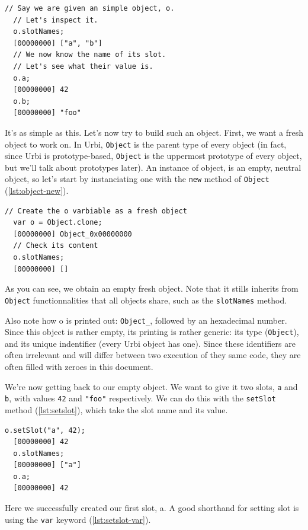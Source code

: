 \documentclass[openright,twoside,12pt]{report}
\newcommand{\urbi}{Urbi\xspace}
\newcommand{\lst}[1]{\autoref{lst:#1}}
\begin{document}
\begin{lstlisting}[caption=Inspecting an \urbi
  object,label=lst:object-slots]
  // Say we are given an simple object, o.
  // Let's inspect it.
  o.slotNames;
  [00000000] ["a", "b"]
  // We now know the name of its slot.
  // Let's see what their value is.
  o.a;
  [00000000] 42
  o.b;
  [00000000] "foo"
\end{lstlisting}

It's as simple as this. Let's now try to build such an object. First,
we want a fresh object to work on. In \urbi, \texttt{Object} is the
parent type of every object (in fact, since \urbi is prototype-based,
\texttt{Object} is the uppermost prototype of every object, but we'll
talk about prototypes later). An instance of object, is an empty,
neutral object, so let's start by instanciating one with the
\texttt{new} method of \texttt{Object} (\lst{object-new}).

\begin{lstlisting}[caption=Instanciating a new object,
  label=lst:object-new]
  // Create the o varbiable as a fresh object
  var o = Object.clone;
  [00000000] Object_0x00000000
  // Check its content
  o.slotNames;
  [00000000] []
\end{lstlisting}

As you can see, we obtain an empty fresh object. Note that it stills
inherits from \texttt{Object} functionnalities that all objects share,
such as the \texttt{slotNames} method.

Also note how o is printed out: \texttt{Object\_}, followed by an
hexadecimal number. Since this object is rather empty, its printing is
rather generic: its type (\texttt{Object}), and its unique indentifier
(every \urbi object has one). Since these identifiers are often
irrelevant and will differ between two execution of they same code,
they are often filled with zeroes in this document.

We're now getting back to our empty object. We want to give it two
slots, \texttt{a} and \texttt{b}, with values \lstinline|42| and
\lstinline|"foo"| respectively. We can do this with the
\texttt{setSlot} method (\lst{setslot}), which take the slot name and
its value.

\begin{lstlisting}[caption=Defining slots, label=lst:setslot]
  o.setSlot("a", 42);
  [00000000] 42
  o.slotNames;
  [00000000] ["a"]
  o.a;
  [00000000] 42
\end{lstlisting}

Here we successfully created our first slot, a. A good shorthand for
setting slot is using the \texttt{var} keyword (\lst{setslot-var}).
\end{document}
